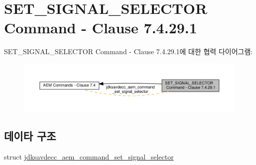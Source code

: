 \hypertarget{group__command__set__signal__selector}{}\section{S\+E\+T\+\_\+\+S\+I\+G\+N\+A\+L\+\_\+\+S\+E\+L\+E\+C\+T\+OR Command -\/ Clause 7.4.29.1}
\label{group__command__set__signal__selector}
S\+E\+T\+\_\+\+S\+I\+G\+N\+A\+L\+\_\+\+S\+E\+L\+E\+C\+T\+OR Command -\/ Clause 7.4.29.1에 대한 협력 다이어그램\+:
\nopagebreak
\begin{figure}[H]
\begin{center}
\leavevmode
\includegraphics[width=350pt]{group__command__set__signal__selector}
\end{center}
\end{figure}
\subsection*{데이타 구조}
\begin{DoxyCompactItemize}
\item 
struct \hyperlink{structjdksavdecc__aem__command__set__signal__selector}{jdksavdecc\+\_\+aem\+\_\+command\+\_\+set\+\_\+signal\+\_\+selector}
\end{DoxyCompactItemize}
